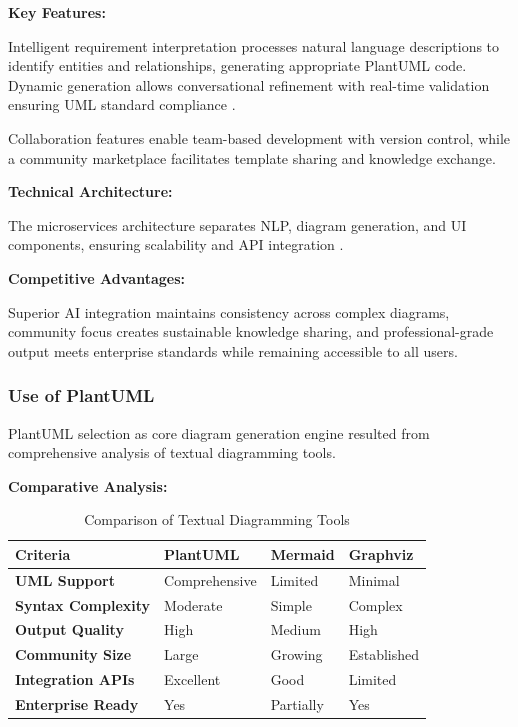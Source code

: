 \textbf{Key Features:}

Intelligent requirement interpretation processes natural language descriptions to identify entities and relationships, generating appropriate PlantUML code. Dynamic generation allows conversational refinement with real-time validation ensuring UML standard compliance \cite{plantuml_standards}.

Collaboration features enable team-based development with version control, while a community marketplace facilitates template sharing and knowledge exchange.

\textbf{Technical Architecture:}

The microservices architecture separates NLP, diagram generation, and UI components, ensuring scalability and API integration \cite{microservices_design}.

\textbf{Competitive Advantages:}

Superior AI integration maintains consistency across complex diagrams, community focus creates sustainable knowledge sharing, and professional-grade output meets enterprise standards while remaining accessible to all users.

\subsubsection{Use of PlantUML}

PlantUML selection as core diagram generation engine resulted from comprehensive analysis of textual diagramming tools.

\textbf{Comparative Analysis:}

\begin{table}[htbp]
\centering
\caption{Comparison of Textual Diagramming Tools}
\label{tab:diagramming_tools}
\begin{tabular}{|p{2.5cm}|p{2.5cm}|p{2.5cm}|p{2.5cm}|}
\hline
\textbf{Criteria} & \textbf{PlantUML} & \textbf{Mermaid} & \textbf{Graphviz} \\
\hline
\textbf{UML Support} & Comprehensive & Limited & Minimal \\
\hline
\textbf{Syntax Complexity} & Moderate & Simple & Complex \\
\hline
\textbf{Output Quality} & High & Medium & High \\
\hline
\textbf{Community Size} & Large & Growing & Established \\
\hline
\textbf{Integration APIs} & Excellent & Good & Limited \\
\hline
\textbf{Enterprise Ready} & Yes & Partially & Yes \\
\hline
\end{tabular}
\end{table}


